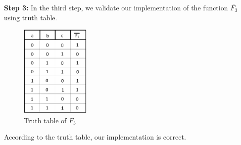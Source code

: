 \documentclass[pdftex,12pt,a4paper]{article}
\begin{document}
\begin{itemize}
   \textbf{Step 3:} In the third step, we validate our implementation of the function $\overline{F_3}$ using truth table.\\
    \begin{figure}[H]
    \centering
        \includegraphics[width=0.3\textwidth]{truth.png}	
        \caption{Truth table of \textbf{$\overline{F_3}$}}
        \label{fig1}
   \end{figure}
    According to the truth table, our implementation is correct.
\end{itemize}
\end{document}
